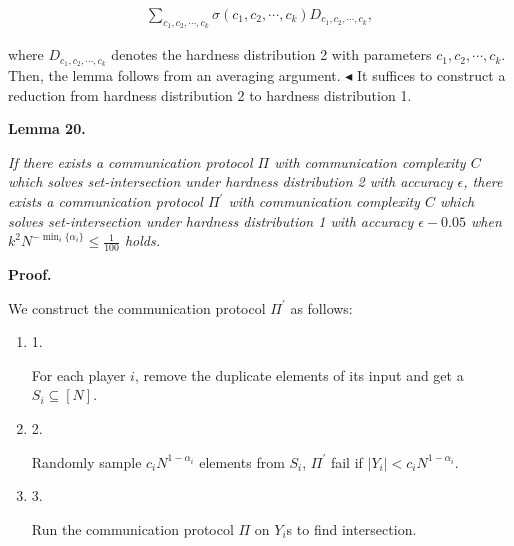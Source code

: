 \documentclass[10pt,a4paper]{article}
\begin{document}
\[\begin{gathered}
\sum_{c_{1},c_{2},\cdots,c_{k}}\sigma(c_{1},c_{2},\cdots,c_{k})D_{c_{1},c_{2},\cdots,c_{k}},
\end{gathered}\]


where $D_{c_{1},c_{2},\cdots,c_{k}}$ denotes the hardness distribution 2 with parameters $c_{1},c_{2},\cdots,c_{k}$. Then, the lemma follows from an averaging argument.
$\blacktriangleleft$
It suffices to construct a reduction from hardness distribution 2 to hardness distribution 1.\par





\par\medskip\noindent\textbf{
\textbf{Lemma 20}\textbf{.}
}\par



\emph{If there exists a communication protocol $\Pi$ with communication complexity $C$ which solves set-intersection under hardness distribution 2 with accuracy $\epsilon$, there exists a communication protocol $\Pi^{\prime}$ with communication complexity $C$ which solves set-intersection under hardness distribution 1 with accuracy $\epsilon-0.05$ when $k^{2}N^{-\min_{i}\{\alpha_{i}\}}\leq\frac{1}{100}$ holds.}\par







\par\medskip\noindent\textbf{Proof.}\par




We construct the communication protocol $\Pi^{\prime}$ as follows:\par


\begin{enumerate}


\item[] 
1. 


For each player $i$, remove the duplicate elements of its input and get a $S_{i}\subseteq[N]$.\par





\item[] 
2. 


Randomly sample $c_{i}N^{1-\alpha_{i}}$ elements from $S_{i}$, $\Pi^{\prime}$ fail if $|Y_{i}|<c_{i}N^{1-\alpha_{i}}$.\par





\item[] 
3. 


Run the communication protocol $\Pi$ on $Y_{i}$s to find intersection.\par





\end{enumerate}
\end{document}
